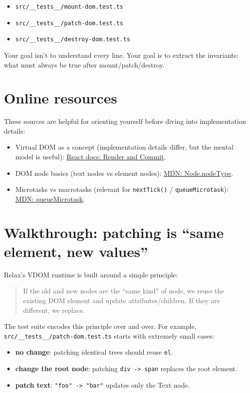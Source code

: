 \begin{itemize}
  \item \texttt{src/\_\_tests\_\_/mount-dom.test.ts}
  \item \texttt{src/\_\_tests\_\_/patch-dom.test.ts}
  \item \texttt{src/\_\_tests\_\_/destroy-dom.test.ts}
\end{itemize}

Your goal isn't to understand every line.
Your goal is to extract the invariants: what must always be true after mount/patch/destroy.

\section{Online resources}
These sources are helpful for orienting yourself before diving into implementation details:

\begin{itemize}
  \item Virtual DOM as a concept (implementation details differ, but the mental model is useful):
    \href{https://react.dev/learn/render-and-commit}{React docs: Render and Commit}.
  \item DOM node basics (text nodes vs element nodes):
    \href{https://developer.mozilla.org/en-US/docs/Web/API/Node/nodeType}{MDN: Node.nodeType}.
  \item Microtasks vs macrotasks (relevant for \texttt{nextTick()} / \texttt{queueMicrotask}):
    \href{https://developer.mozilla.org/en-US/docs/Web/API/queueMicrotask}{MDN: queueMicrotask}.
\end{itemize}

\section{Walkthrough: patching is ``same element, new values''}
Relax's VDOM runtime is built around a simple principle:

\begin{quote}
If the old and new nodes are the ``same kind'' of node, we reuse the existing DOM element and update attributes/children.
If they are different, we replace.
\end{quote}

The test suite encodes this principle over and over.
For example, \texttt{src/\_\_tests\_\_/patch-dom.test.ts} starts with extremely small cases:

\begin{itemize}
  \item \textbf{no change}: patching identical trees should reuse \texttt{el}.
  \item \textbf{change the root node}: patching \texttt{div -> span} replaces the root element.
  \item \textbf{patch text}: \texttt{"foo" -> "bar"} updates only the Text node.
\end{itemize}

